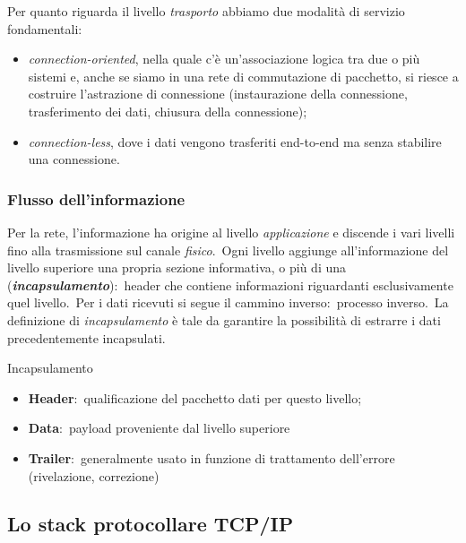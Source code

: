 Per quanto riguarda il livello \emph{trasporto} abbiamo due modalità di servizio fondamentali:\
\begin{itemize}
    \item \emph{connection-oriented}, nella quale c'è un'associazione logica tra due o più sistemi e, anche se siamo in una rete di commutazione di pacchetto, si riesce a costruire l'astrazione di connessione (instaurazione della connessione, trasferimento dei dati, chiusura della connessione);
    \item \emph{connection-less}, dove i dati vengono trasferiti end-to-end ma senza stabilire una connessione.
\end{itemize}

\subsubsection{Flusso dell'informazione}

Per la rete, l'informazione ha origine al livello \emph{applicazione} e discende i vari livelli fino alla trasmissione sul canale \emph{fisico}.\
Ogni livello aggiunge all'informazione del livello superiore una propria sezione informativa, o più di una (\textbf{\emph{incapsulamento}}):\ header che contiene informazioni riguardanti esclusivamente quel livello.\
Per i dati ricevuti si segue il cammino inverso:\ processo inverso.\
La definizione di \emph{incapsulamento} è tale da garantire la possibilità di estrarre i dati precedentemente incapsulati.

Incapsulamento
\begin{itemize}
    \item \textbf{Header}:\ qualificazione del pacchetto dati per questo livello;
    \item \textbf{Data}:\ payload proveniente dal livello superiore
    \item \textbf{Trailer}:\ generalmente usato in funzione di trattamento dell'errore (rivelazione, correzione)
\end{itemize}

\subsection{Lo stack protocollare TCP/IP}

